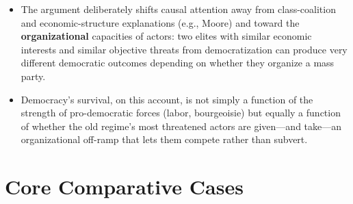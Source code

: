 \documentclass[12pt]{article}
\begin{document}
\begin{itemize}[leftmargin=*, itemsep=4pt]
    \item The argument deliberately shifts causal attention away from class-coalition and economic-structure explanations (e.g., Moore) and toward the \textbf{organizational} capacities of actors: two elites with similar economic interests and similar objective threats from democratization can produce very different democratic outcomes depending on whether they organize a mass party.
    \item Democracy's survival, on this account, is not simply a function of the strength of pro-democratic forces (labor, bourgeoisie) but equally a function of whether the old regime's most threatened actors are given---and take---an organizational off-ramp that lets them compete rather than subvert.
\end{itemize}

\section{Core Comparative Cases}
\end{document}
